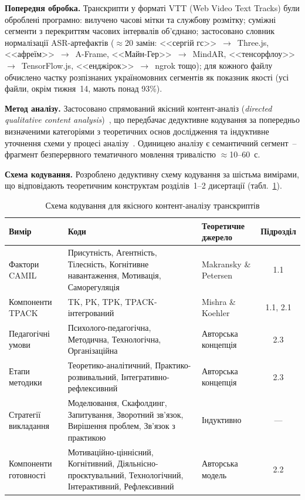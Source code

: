 \textbf{Попередня обробка.} Транскрипти у форматі VTT (Web Video Text Tracks) були оброблені програмно: вилучено часові мітки та службову розмітку; суміжні сегменти з перекриттям часових інтервалів об'єднано; застосовано словник нормалізації ASR-артефактів ($\approx$20 замін: <<сергій гс>>~$\to$~Three.js, <<афреїм>>~$\to$~A-Frame, <<Майн-Гер>>~$\to$~MindAR, <<тенсорфлоу>>~$\to$~TensorFlow.js, <<енджірок>>~$\to$~ngrok тощо); для кожного файлу обчислено частку розпізнаних україномовних сегментів як показник якості (усі файли, окрім тижня~14, мають понад 93\%).

\textbf{Метод аналізу.} Застосовано спрямований якісний контент-аналіз (\textit{directed qualitative content analysis})~\cite{Hsieh2005QCA, Mayring2014QCA}, що передбачає дедуктивне кодування за попередньо визначеними категоріями з теоретичних основ дослідження та індуктивне уточнення схеми у процесі аналізу~\cite{Kuckartz2019QTA}. Одиницею аналізу є семантичний сегмент~-- фрагмент безперервного тематичного мовлення тривалістю $\approx$10--60~с.

\textbf{Схема кодування.} Розроблено дедуктивну схему кодування за шістьма вимірами, що відповідають теоретичним конструктам розділів~1--2 дисертації (табл.~\ref{tab:coding_scheme}).

\begin{table}[!h]
\centering
\caption{Схема кодування для якісного контент-аналізу транскриптів}
\label{tab:coding_scheme}
\small
\begin{tabularx}{\linewidth}{|p{3cm}|X|p{3.9cm}|c|}
\hline
\hfil \textbf{Вимір} & \hfil \textbf{Коди} & \hfil \textbf{Теоретичне джерело} & \textbf{Підрозділ} \\
\hline
Фактори CAMIL & Присутність, Агентність, Тілесність, Когнітивне навантаження, Мотивація, Саморегуляція & Makransky \& Petersen \cite{Makransky2021CAMIL}
 & 1.1 \\
\hline
Компоненти TPACK & TK, PK, TPK, TPACK-інтегрований & Mishra \& Koehler \cite{Gurevych2015Integration} & 1.1, 2.1 \\
\hline
Педагогічні умови & Психолого-педагогічна, Методична, Технологічна, Організаційна & Авторська концепція & 2.3 \\
\hline
Етапи методики & Теоретико-аналітичний, Практико-розвивальний, Інтегративно-рефлексивний & Авторська концепція & 2.3 \\
\hline
Стратегії викладання & Моделювання, Скафолдинг, Запитування, Зворотний зв'язок, Вирішення проблем, Зв'язок з практикою & Індуктивно & --- \\
\hline
Компоненти готовності & Мотиваційно-ціннісний, Когнітивний, Діяльнісно-проєктувальний, Технологічний, Інтерактивний, Рефлексивний & Авторська модель & 2.2 \\
\hline
\end{tabularx}
\end{table}

